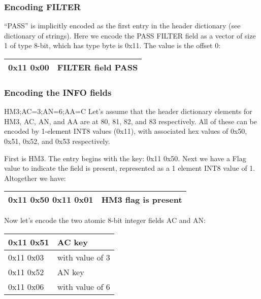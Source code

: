 \documentclass[8pt]{article}
\begin{document}
\subsubsection{Encoding FILTER}

``PASS'' is implicitly encoded as the first entry in the header dictionary (see dictionary of strings).  Here we encode the PASS FILTER field as a vector of size 1 of type 8-bit, which has type byte is 0x11.  The value is the offset 0:

\vspace{0.3cm}
\begin{tabular}{|l| l|} \hline
0x11 0x00 & FILTER field PASS \\ \hline
\end{tabular}

\subsubsection{Encoding the INFO fields}

HM3;AC=3;AN=6;AA=C
Let's assume that the header dictionary elements for HM3, AC, AN, and AA are at 80, 81, 82, and 83 respectively.  All of these can be encoded by 1-element INT8 values (0x11), with associated hex values of 0x50, 0x51, 0x52, and 0x53 respectively.

First is HM3.  The entry begins with the key: 0x11 0x50.  Next we have a Flag value to indicate the field is present, represented as a 1 element INT8 value of 1.  Altogether we have:

\vspace{0.3cm}
\begin{tabular}{|l| l|} \hline
0x11 0x50 0x11 0x01 & HM3 flag is present \\ \hline
\end{tabular}
\vspace{0.3cm}

Now let's encode the two atomic 8-bit integer fields AC and AN:

\vspace{0.3cm}
\begin{tabular}{|l| l|} \hline
0x11 0x51 & AC key \\ \hline
0x11 0x03 & with value of 3 \\ \hline
0x11 0x52 & AN key \\ \hline
0x11 0x06 & with value of 6 \\ \hline
\end{tabular}
\vspace{0.3cm}
\end{document}
